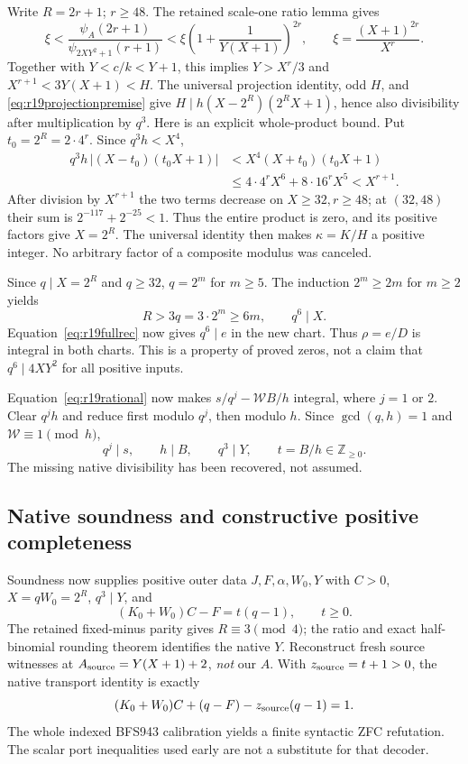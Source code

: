 Write $R=2r+1$; $r\ge48$. The retained scale-one ratio lemma gives
\[
 \xi<\frac{\psi_A(2r+1)}{\psi_{2XY^2+1}(r+1)}
 <\xi\left(1+\frac1{Y(X+1)}\right)^{2r},\qquad
 \xi=\frac{(X+1)^{2r}}{X^r}.
\]
Together with $Y<c/k<Y+1$, this implies $Y>X^r/3$ and
$X^{r+1}<3Y(X+1)<H$. The universal projection identity, odd $H$, and
\eqref{eq:r19projectionpremise} give
$H\mid h(X-2^R)(2^RX+1)$, hence also divisibility after multiplication
by $q^3$. Here is an explicit whole-product bound. Put $t_0=2^R=2\cdot4^r$.
Since $q^3h<X^4$,
\begin{align*}
 q^3h\,|(X-t_0)(t_0X+1)|
 &<X^4(X+t_0)(t_0X+1)\\
 &\le4\cdot4^rX^6+8\cdot16^rX^5<X^{r+1}.
\end{align*}
After division by $X^{r+1}$ the two terms decrease on $X\ge32,r\ge48$;
at $(32,48)$ their sum is $2^{-117}+2^{-25}<1$. Thus the entire product
is zero, and its positive factors give $X=2^R$. The universal identity then
makes $\kappa=K/H$ a positive integer. No arbitrary factor of a composite
modulus was canceled.

Since $q\mid X=2^R$ and $q\ge32$, $q=2^m$ for $m\ge5$.
The induction $2^m\ge2m$ for $m\ge2$ yields
\[
 R>3q=3\cdot2^m\ge6m,\qquad q^6\mid X.
\]
Equation~\eqref{eq:r19fullrec} now gives $q^6\mid e$ in the new chart.
Thus $\rho=e/D$ is integral in both charts. This is a property of proved
zeros, not a claim that $q^6\mid4XY^2$ for all positive inputs.

Equation~\eqref{eq:r19rational} now makes $s/q^j-\mathcal WB/h$
integral, where $j=1$ or $2$. Clear $q^jh$ and reduce first modulo
$q^j$, then modulo $h$. Since $\gcd(q,h)=1$ and $\mathcal W\equiv1\pmod h$,
\[
 q^j\mid s,\qquad h\mid B,\qquad q^3\mid Y,
 \qquad t=B/h\in\mathbb Z_{\ge0}.
\]
The missing native divisibility has been recovered, not assumed.

\subsection{Native soundness and constructive positive completeness}
Soundness now supplies positive outer data $J,F,\alpha,W_0,Y$ with
$C>0$, $X=qW_0=2^R$, $q^3\mid Y$, and
\[
 (K_0+W_0)C-F=t(q-1),\qquad t\ge0.
\]
The retained fixed-minus parity gives $R\equiv3\pmod4$; the ratio and
exact half-binomial rounding theorem identifies the native $Y$. Reconstruct
fresh source witnesses at $A_{\rm source}=Y(X+1)+2$, \emph{not} our $A$.
With $z_{\rm source}=t+1>0$, the native transport identity is exactly
\[
 (K_0+W_0)C+(q-F)-z_{\rm source}(q-1)=1.
\]
The whole indexed BFS943 calibration yields a finite syntactic ZFC refutation.
The scalar port inequalities used early are not a substitute for that decoder.

